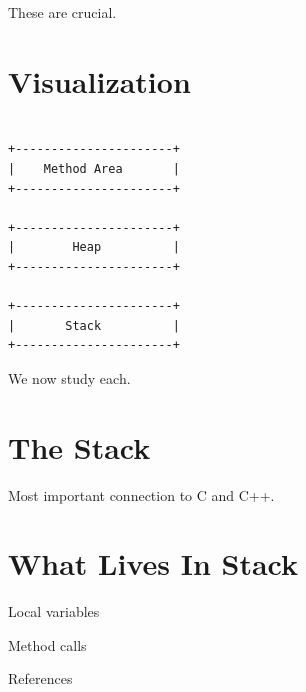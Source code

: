 \documentclass[11pt,a4paper]{book}
\begin{document}

These are crucial.


\section{Visualization}

\begin{verbatim}

+----------------------+
|    Method Area       |
+----------------------+

+----------------------+
|        Heap          |
+----------------------+

+----------------------+
|       Stack          |
+----------------------+

\end{verbatim}


We now study each.


\section{The Stack}

Most important connection
to C and C++.


\section{What Lives In Stack}


Local variables


Method calls


References

\end{document}
